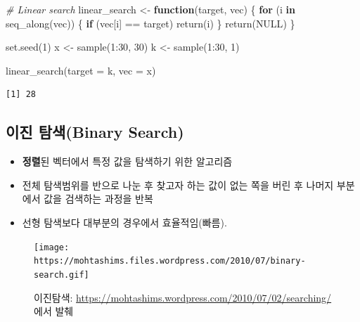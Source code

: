 \documentclass[
  11pt,
]{krantz}
\newenvironment{Shaded}{\begin{snugshade}}{\end{snugshade}}
\newcommand{\AttributeTok}[1]{\textcolor[rgb]{0.61,0.61,0.61}{#1}}
\newcommand{\CommentTok}[1]{\textcolor[rgb]{0.37,0.37,0.37}{\textit{#1}}}
\newcommand{\ConstantTok}[1]{\textcolor[rgb]{0,0,0}{#1}}
\newcommand{\ControlFlowTok}[1]{\textcolor[rgb]{0.27,0.27,0.27}{\textbf{#1}}}
\newcommand{\DecValTok}[1]{\textcolor[rgb]{0.06,0.06,0.06}{#1}}
\newcommand{\FunctionTok}[1]{\textcolor[rgb]{0,0,0}{#1}}
\newcommand{\NormalTok}[1]{#1}
\newcommand{\OtherTok}[1]{\textcolor[rgb]{0.37,0.37,0.37}{#1}}
\newcommand{\SpecialCharTok}[1]{\textcolor[rgb]{0,0,0}{#1}}
\providecommand{\tightlist}{%
  \setlength{\itemsep}{0pt}\setlength{\parskip}{0pt}}
\begin{document}
\begin{Shaded}
\begin{Highlighting}[]
\CommentTok{\# Linear search}
\NormalTok{linear\_search }\OtherTok{\textless{}{-}} \ControlFlowTok{function}\NormalTok{(target, vec) \{}
  \ControlFlowTok{for}\NormalTok{ (i }\ControlFlowTok{in} \FunctionTok{seq\_along}\NormalTok{(vec)) \{}
    \ControlFlowTok{if}\NormalTok{ (vec[i] }\SpecialCharTok{==}\NormalTok{ target) }\FunctionTok{return}\NormalTok{(i)}
\NormalTok{  \}}
  \FunctionTok{return}\NormalTok{(}\ConstantTok{NULL}\NormalTok{)}
\NormalTok{\}}

\FunctionTok{set.seed}\NormalTok{(}\DecValTok{1}\NormalTok{)}
\NormalTok{x }\OtherTok{\textless{}{-}} \FunctionTok{sample}\NormalTok{(}\DecValTok{1}\SpecialCharTok{:}\DecValTok{30}\NormalTok{, }\DecValTok{30}\NormalTok{)}
\NormalTok{k }\OtherTok{\textless{}{-}} \FunctionTok{sample}\NormalTok{(}\DecValTok{1}\SpecialCharTok{:}\DecValTok{30}\NormalTok{, }\DecValTok{1}\NormalTok{)}

\FunctionTok{linear\_search}\NormalTok{(}\AttributeTok{target =}\NormalTok{ k, }\AttributeTok{vec =}\NormalTok{ x)}
\end{Highlighting}
\end{Shaded}

\begin{verbatim}
[1] 28
\end{verbatim}

\normalsize

\hypertarget{uxc774uxc9c4-uxd0d0uxc0c9binary-search}{%
\subsection{이진 탐색(Binary Search)}\label{uxc774uxc9c4-uxd0d0uxc0c9binary-search}}

\begin{itemize}
\tightlist
\item
  \textbf{정렬}된 벡터에서 특정 값을 탐색하기 위한 알고리즘
\item
  전체 탐색범위를 반으로 나눈 후 찾고자 하는 값이 없는 쪽을 버린 후
  나머지 부분에서 값을 검색하는 과정을 반복
\item
  선형 탐색보다 대부분의 경우에서 효율적임(빠름).
\end{itemize}

\begin{figure}
\centering
\texttt{[image: https://mohtashims.files.wordpress.com/2010/07/binary-search.gif]}
\caption{이진탐색: \url{https://mohtashims.wordpress.com/2010/07/02/searching/} 에서 발췌}
\end{figure}
\end{document}
